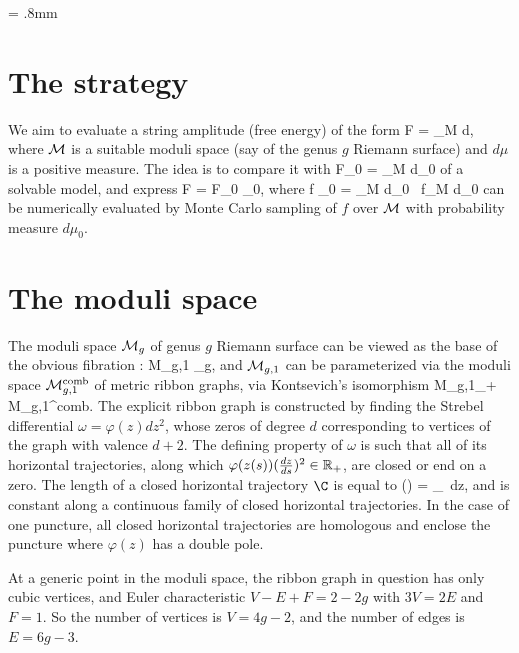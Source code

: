\documentclass[12pt]{article}
\begin{document}
 
\unitlength = .8mm




\section{The strategy}

We aim to evaluate a string amplitude (free energy) of the form
\ie
{\cal F} = \int_{\cal M} d\mu,
\fe 
where ${\cal M}$ is a suitable moduli space (say of the genus $g$ Riemann surface) and $d\mu$ is a positive measure. The idea is to compare it with
\ie
{\cal F}_0 = \int_{\cal M} d\mu_0
\fe
of a solvable model, and express
\ie
{\cal F} = {\cal F}_0 \left{} \right\rangle_0,
\fe
where 
\ie
\left\langle f \right\rangle_0 = { \int_{\cal M} d\mu_0 \, f\over  \int_{\cal M} d\mu_0}
\fe
can be numerically evaluated by Monte Carlo sampling of $f$ over ${\cal M}$ with probability measure $d\mu_0$.


\section{The moduli space}

The moduli space ${\cal M}_g$ of genus $g$ Riemann surface can be viewed as the base of the obvious fibration
\ie
\pi: {\cal M}_{g,1} _g,
\fe
and ${\cal M}_{g,1}$ can be parameterized via the moduli space ${\cal M}_{g,1}^{\rm comb}$ of metric ribbon graphs, via Kontsevich's isomorphism
\ie
{\cal M}_{g,1}\times {}_+ \xrightarrow{\sim} {\cal M}_{g,1}^{\rm comb}.
\fe
The explicit ribbon graph is constructed by finding the Strebel differential $\omega = \varphi(z) dz^2$, whose zeros of degree $d$ corresponding to vertices of the graph with valence $d+2$. The defining property of $\omega$ is such that all of its horizontal trajectories, along which $\varphi(z(s)) ({dz\over ds})^2\in \mathbb{R}_+$, are closed or end on a zero. The length of a closed horizontal trajectory $\C$ is equal to 
\ie
\ell(\C) = \oint_\gamma {}\, dz,
\fe
and is constant along a continuous family of closed horizontal trajectories. In the case of one puncture, all closed horizontal trajectories are homologous and enclose the puncture where $\varphi(z)$ has a double pole.

At a generic point in the moduli space, the ribbon graph in question has only cubic vertices, and Euler characteristic $V-E+F = 2-2g$ with $3V=2E$ and $F=1$. So the number of vertices is $V=4g-2$, and the number of edges is $E=6g-3$. %
\end{document}
